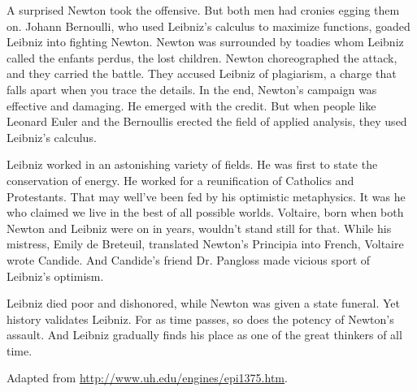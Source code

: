 A surprised Newton took the offensive. But both men had cronies egging them on. Johann Bernoulli, who used Leibniz's calculus to maximize functions, goaded Leibniz into fighting Newton. Newton was surrounded by toadies whom Leibniz called the enfants perdus, the lost children. Newton choreographed the attack, and they carried the battle. They accused Leibniz of plagiarism, a charge that falls apart when you trace the details. In the end, Newton's campaign was effective and damaging. He emerged with the credit. But when people like Leonard Euler and the Bernoullis erected the field of applied analysis, they used Leibniz's calculus.

Leibniz worked in an astonishing variety of fields. He was first to state the conservation of energy. He worked for a reunification of Catholics and Protestants. That may well've been fed by his optimistic metaphysics. It was he who claimed we live in the best of all possible worlds. Voltaire, born when both Newton and Leibniz were on in years, wouldn't stand still for that. While his mistress, Emily de Breteuil, translated Newton's Principia into French, Voltaire wrote Candide. And Candide's friend Dr. Pangloss made vicious sport of Leibniz's optimism.

Leibniz died poor and dishonored, while Newton was given a state funeral. Yet history validates Leibniz. For as time passes, so does the potency of Newton's assault. And Leibniz gradually finds his place as one of the great thinkers of all time.

\begin{flushright}
  Adapted from \url{http://www.uh.edu/engines/epi1375.htm}.
\end{flushright}

\clearpage

